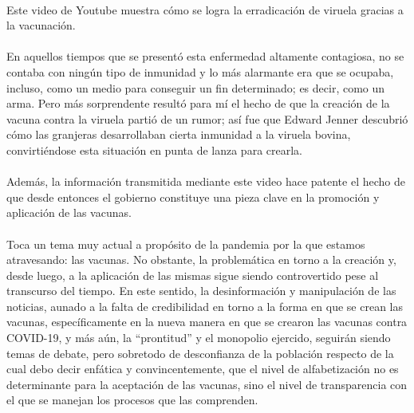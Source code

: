 \documentclass[letterpaper,12pt]{article} %
\begin{document}
	\hfill \break
    \\
	Este video de Youtube muestra cómo se logra la erradicación de viruela gracias a la vacunación.\\ \\
	En aquellos tiempos que se presentó esta enfermedad altamente contagiosa, no se contaba con ningún tipo de inmunidad y lo más alarmante era que se ocupaba, incluso, como un medio para conseguir un fin determinado; es decir, como un arma. Pero más sorprendente resultó para mí el hecho de que la creación de la vacuna contra la viruela partió de un rumor; así fue que Edward Jenner descubrió cómo las granjeras desarrollaban cierta inmunidad a la viruela bovina, convirtiéndose esta situación en punta de lanza para crearla. \\ \\
	Además, la información transmitida mediante este video hace patente el hecho de que desde entonces el gobierno constituye una pieza clave en la promoción y aplicación de las vacunas. \\ \\
	Toca un tema muy actual a propósito de la pandemia por la que estamos atravesando: las vacunas. No obstante, la problemática en torno a la creación y, desde luego, a la aplicación de las mismas sigue siendo controvertido pese al transcurso del tiempo. En este sentido, la desinformación y manipulación de las noticias, aunado a la falta de credibilidad en torno a la forma en que se crean las vacunas, específicamente en la nueva manera en que se crearon las vacunas contra COVID-19, y más aún, la “prontitud” y el monopolio ejercido, seguirán siendo temas de debate, pero sobretodo de desconfianza de la población respecto de la cual debo decir enfática y convincentemente, que el nivel de alfabetización no es determinante para la aceptación de las vacunas, sino el nivel de transparencia con el que se manejan los procesos que las comprenden.
\end{document}
